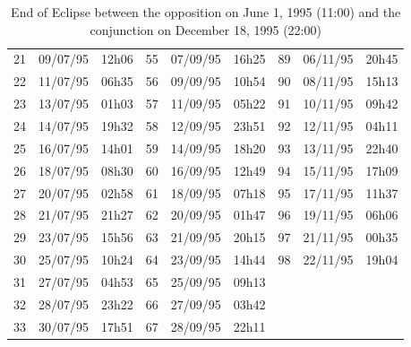 \documentclass{tufte-handout}
\begin{document}
\begin{table}
\begin{tabular}{lll|lll|lll}
21 & 09/07/95 & 12h06 & 55 & 07/09/95 & 16h25 & 89 & 06/11/95 & 20h45\\
22 & 11/07/95 & 06h35 & 56 & 09/09/95 & 10h54 & 90 & 08/11/95 & 15h13\\
23 & 13/07/95 & 01h03 & 57 & 11/09/95 & 05h22 & 91 & 10/11/95 & 09h42\\
24 & 14/07/95 & 19h32 & 58 & 12/09/95 & 23h51 & 92 & 12/11/95 & 04h11\\
25 & 16/07/95 & 14h01 & 59 & 14/09/95 & 18h20 & 93 & 13/11/95 & 22h40\\
26 & 18/07/95 & 08h30 & 60 & 16/09/95 & 12h49 & 94 & 15/11/95 & 17h09\\
27 & 20/07/95 & 02h58 & 61 & 18/09/95 & 07h18 & 95 & 17/11/95 & 11h37\\
28 & 21/07/95 & 21h27 & 62 & 20/09/95 & 01h47 & 96 & 19/11/95 & 06h06\\
29 & 23/07/95 & 15h56 & 63 & 21/09/95 & 20h15 & 97 & 21/11/95 & 00h35\\
30 & 25/07/95 & 10h24 & 64 & 23/09/95 & 14h44 & 98 & 22/11/95 & 19h04\\
31 & 27/07/95 & 04h53 & 65 & 25/09/95 & 09h13 & & &\\
32 & 28/07/95 & 23h22 & 66 & 27/09/95 & 03h42 & & &\\
33 & 30/07/95 & 17h51 & 67 & 28/09/95 & 22h11 & & &\\
\end{tabular}
\caption{End of Eclipse between the opposition on June 1, 1995 (11:00) and the conjunction on December 18, 1995 (22:00)}
\end{table}
\end{document}
